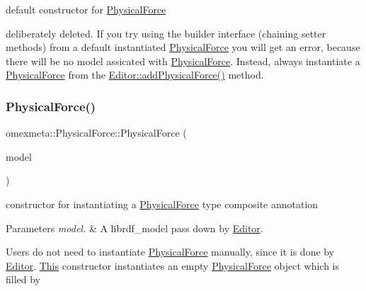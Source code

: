 default constructor for \hyperlink{classomexmeta_1_1PhysicalForce}{Physical\+Force} 

deliberately deleted. If you try using the builder interface (chaining setter methods) from a default instantiated \hyperlink{classomexmeta_1_1PhysicalForce}{Physical\+Force} you will get an error, because there will be no model assicated with \hyperlink{classomexmeta_1_1PhysicalForce}{Physical\+Force}. Instead, always instantiate a \hyperlink{classomexmeta_1_1PhysicalForce}{Physical\+Force} from the \hyperlink{classomexmeta_1_1Editor_a7833e03995f6323109c2db8d59104f6c}{Editor\+::add\+Physical\+Force()} method. \mbox{\label{classomexmeta_1_1PhysicalForce_a673e6810fe969bcd087ab88c62e5e041}} 
\subsubsection{\texorpdfstring{Physical\+Force()}{PhysicalForce()}\hspace{0.1cm}{\footnotesize\ttfamily [2/3]}}
{\footnotesize\ttfamily omexmeta\+::\+Physical\+Force\+::\+Physical\+Force (\begin{DoxyParamCaption}\item[{librdf\+\_\+model $\ast$}]{model }\end{DoxyParamCaption})\hspace{0.3cm}{\ttfamily [explicit]}}



constructor for instantiating a \hyperlink{classomexmeta_1_1PhysicalForce}{Physical\+Force} type composite annotation 


\begin{DoxyParams}{Parameters}
{\em model.} & A librdf\+\_\+model pass down by \hyperlink{classomexmeta_1_1Editor}{Editor}.\\
\hline
\end{DoxyParams}
Users do not need to instantiate \hyperlink{classomexmeta_1_1PhysicalForce}{Physical\+Force} manually, since it is done by \hyperlink{classomexmeta_1_1Editor}{Editor}. \hyperlink{classThis}{This} constructor instantiates an empty \hyperlink{classomexmeta_1_1PhysicalForce}{Physical\+Force} object which is filled by \mbox{\label{classomexmeta_1_1PhysicalForce_a2ff9aecd73a5356be701d8ba7e9bf71c}} 
